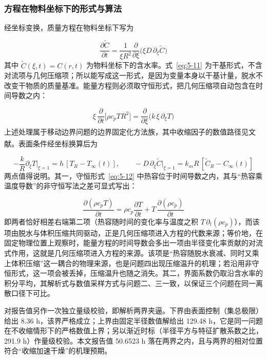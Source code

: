 \subsubsection{方程在物料坐标下的形式与算法}
经坐标变换，质量方程在物料坐标下写为

\begin{equation}
  \frac{\partial \tilde C}{\partial t}=\frac{1}{\xi R^2}\frac{\partial}{\partial\xi}\Big(\xi D\,\partial_\xi \tilde C\Big)
  \label{eq:5-11}
\end{equation}
其中 $\tilde C(\xi,t)=C(r,t)$ 为物料坐标下的含水率。式~\eqref{eq:5-11} 为干基形式，不含对流项与几何压缩项；所以能写成这一形式，是因为变量本身以干基计量，脱水不改变干物质的质量基准。能量方程则必须取守恒形式，把几何压缩项自动包含在时间导数之内：

\begin{equation}
  \xi\,\frac{\partial}{\partial t}\Big[\rho c_p T R^2\Big]=\frac{\partial}{\partial\xi}\Big(k\,\xi\,\partial_\xi T\Big)
  \label{eq:5-12}
\end{equation}
上述处理属于移动边界问题的边界固定化方法族\textsuperscript{\cite{ref12,ref15,ref16,ref17,ref18}}，其中收缩因子的数值路径见文献\textsuperscript{\cite{ref13}}。表面条件经坐标换算后为

\begin{equation}
  -\frac{k}{R}\partial_\xi T\big|_{\xi=1}=h\,[T_R-T_\infty(t)],\qquad -D\,\partial_\xi \tilde C\big|_{\xi=1}=k_m R\,[\tilde C_R-C_\infty(t)]
  \label{eq:5-13}
\end{equation}
两点值得说明。其一，守恒形式~\eqref{eq:5-12} 中热容位于时间导数之内，其与“热容乘温度导数”的非守恒写法之差可显式写出：

\begin{equation}
  \frac{\partial(\rho c_pT)}{\partial t}=\rho c_p\frac{\partial T}{\partial t}+T\,\frac{\partial(\rho c_p)}{\partial t}
  \label{eq:5-25}
\end{equation}
即两者恰好相差右端第二项（热容随时间的变化率与温度之积 $T\,\partial_t(\rho c_p)$），而该项由脱水与体积压缩共同驱动，正是几何压缩项进入方程的代数来源；等价地，在固定物理位置上观察时，能量方程的时间导数会多出一项由半径变化率贡献的对流式作用，这就是几何压缩项进入方程的来源。该项是“热容随脱水衰减、同时又乘上体积压缩”这一耦合的物理来源，也是问题四出现压缩温升的机理；若沿用非守恒形式，这一项会被丢掉，压缩温升也随之消失。其二，界面系数仍取沿含水率的积分平均，其解析式与数值采样方式与问题二、三一致，以保证三个问题在同一离散口径下可比。

对报告值另作一次独立量级校验，即解析两界夹逼。下界由表面控制（集总极限）给出 8.36 h，该界严格成立；上界由固定半径数值解给出 129.48 h，它是同一问题在不收缩情形下的严格数值上界；另以渐近时标（半径平方与特征扩散系数之比，291.9 h）作量级校验。本文报告值 50.6523 h 落在两界之内，且与两界的相对位置符合“收缩加速干燥”的机理预期。

